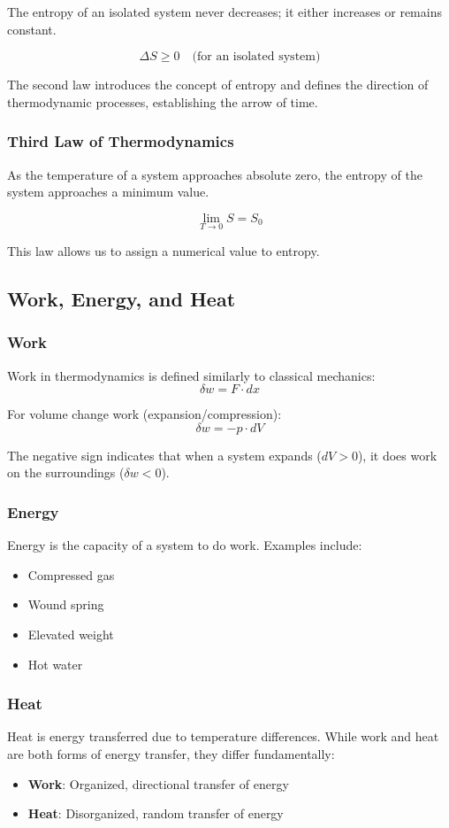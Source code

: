\documentclass{article}
\theoremstyle{definition}
\begin{document}
The entropy of an isolated system never decreases; it either increases or remains constant.

\[
\Delta S \geq 0 \quad \text{(for an isolated system)}
\]

The second law introduces the concept of entropy and defines the direction of thermodynamic processes, establishing the arrow of time.

\subsubsection{Third Law of Thermodynamics}

As the temperature of a system approaches absolute zero, the entropy of the system approaches a minimum value.

\[
\lim_{T \to 0} S = S_0
\]

This law allows us to assign a numerical value to entropy.

\subsection{Work, Energy, and Heat}

\subsubsection{Work}
Work in thermodynamics is defined similarly to classical mechanics:
\[
\delta w = F \cdot dx
\]

For volume change work (expansion/compression):
\[
\delta w = -p \cdot dV
\]

The negative sign indicates that when a system expands ($dV > 0$), it does work on the surroundings ($\delta w < 0$).

\subsubsection{Energy}
Energy is the capacity of a system to do work. Examples include:
\begin{itemize}
    \item Compressed gas
    \item Wound spring
    \item Elevated weight
    \item Hot water
\end{itemize}

\subsubsection{Heat}
Heat is energy transferred due to temperature differences. While work and heat are both forms of energy transfer, they differ fundamentally:
\begin{itemize}
    \item \textbf{Work}: Organized, directional transfer of energy
    \item \textbf{Heat}: Disorganized, random transfer of energy
\end{itemize}
\end{document}
